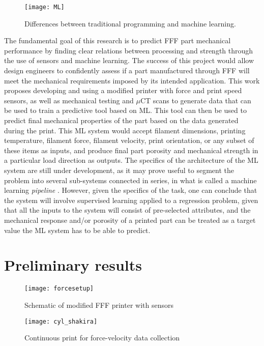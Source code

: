 \documentclass[main.tex]{subfiles}
\begin{document}
\begin{figure}[!htbp]
	\center
	\texttt{[image: ML]}
	\caption{Differences between traditional programming and machine learning. \cite{Chollet2018}} \label{fig:MLvsP}
\end{figure}

The fundamental goal of this research is to predict FFF part mechanical performance by finding clear relations between processing and strength through the use of sensors and machine learning. The success of this project would allow design engineers to confidently assess if a part manufactured through FFF will meet the mechanical requirements imposed by its intended application. This work proposes developing and using a modified printer with force and print speed sensors, as well as mechanical testing and $\mu$CT scans to generate data that can be used to train a predictive tool based on ML. This tool can then be used to predict final mechanical properties of the part based on the data generated during the print. This ML system would accept filament dimensions, printing temperature, filament force, filament velocity, print orientation, or any subset of these items as inputs, and produce final part porosity and mechanical strength in a particular load direction as outputs. The specifics of the architecture of the ML system are  still under development, as it may prove useful to segment the problem into several sub-systems connected in series, in what is called a machine learning \emph{pipeline} \cite{Geron2019}. However, given the specifics of the task, one can conclude that the system will involve supervised learning applied to a regression problem, given that all the inputs to the system will consist of pre-selected attributes, and the mechanical response and/or porosity of a printed part can be treated as a target value the ML system has to be able to predict. 

\section{Preliminary results} \label{sec:prelim}


\begin{figure}[!htbp]
	\center
	\texttt{[image: forcesetup]}
	\caption{Schematic of modified FFF printer with sensors} \label{fig:shakira}
\end{figure}

\begin{figure}[!htbp]
	\center
	\texttt{[image: cyl\_shakira]}
	\caption{Continuous print for force-velocity data collection} \label{fig:cyl}
\end{figure}
\end{document}
